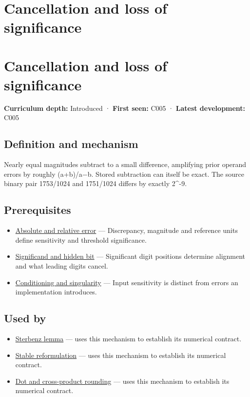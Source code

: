 \hypertarget{appendix-a2773a6a2f9d}{}
\section*{Cancellation and loss of significance}
\section{Cancellation and loss of significance}\label{appendix-a2773a6a2f9d-cancellation-and-loss-of-significance}

\textbf{Curriculum depth:} Introduced · \textbf{First seen:} C005 · \textbf{Latest development:} C005

\subsection{Definition and mechanism}\label{appendix-a2773a6a2f9d-definition-and-mechanism}

Nearly equal magnitudes subtract to a small difference, amplifying prior operand errors by roughly (\textbar a\textbar+\textbar b\textbar)/\textbar a−b\textbar. Stored subtraction can itself be exact. The source binary pair 1753/1024 and 1751/1024 differs by exactly 2\^{}-9.

\subsection{Prerequisites}\label{appendix-a2773a6a2f9d-prerequisites}

\begin{itemize}
\tightlist
\item
  \hyperref[appendix-3ae74e89b4e6]{Absolute and relative error} --- Discrepancy, magnitude and reference units define sensitivity and threshold significance.
\item
  \hyperref[appendix-a24fd710cf67]{Significand and hidden bit} --- Significant digit positions determine alignment and what leading digits cancel.
\item
  \hyperref[appendix-8f6a01f284a7]{Conditioning and singularity} --- Input sensitivity is distinct from errors an implementation introduces.
\end{itemize}

\subsection{Used by}\label{appendix-a2773a6a2f9d-used-by}

\begin{itemize}
\tightlist
\item
  \hyperref[appendix-399b7ad53f39]{Sterbenz lemma} --- uses this mechanism to establish its numerical contract.
\item
  \hyperref[appendix-d7f8ba961670]{Stable reformulation} --- uses this mechanism to establish its numerical contract.
\item
  \hyperref[appendix-5aef4f13483a]{Dot and cross-product rounding} --- uses this mechanism to establish its numerical contract.
\end{itemize}

